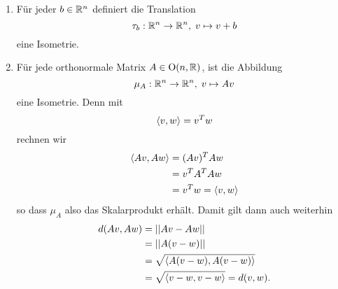 \documentclass{book}
\begin{document}
\begin{exas}
    \label{exas:bewegungen}
    \begin{enumerate}
        \item {}Für jeder $b \in \mathbb{R}^n$ definiert die Translation
            \[
                \tau_b: \mathbb{R}^n \to \mathbb{R}^n, \; v \mapsto v + b
            \]
            eine Isometrie. 
        \item {}Für jede orthonormale Matrix $A \in \operatorname{O}(n,\mathbb{R})$, ist die Abbildung
            \[
                \mu_A: \mathbb{R}^n \to \mathbb{R}^n, \; v \mapsto Av
            \]
            eine Isometrie. Denn mit
            \[
                \langle v,w \rangle = v^T w
            \]
            rechnen wir
            \begin{align*}
                \langle Av,Aw \rangle &= (Av)^TAw \\
                           &= v^T A^T A w\\
                           &= v^T w = \langle v,w \rangle
            \end{align*}
            so dass $\mu_A$ also das Skalarprodukt erhält. Damit gilt dann auch weiterhin
            \begin{align*}
                d(Av,Aw) &= || Av - Aw || \\
                         &= || A(v-w) ||\\
                         &= \sqrt{\langle A(v-w),A(v-w) \rangle}\\
                         &= \sqrt{\langle v-w,v-w \rangle} = d(v,w).
            \end{align*}
    \end{enumerate}
\end{exas}
\end{document}
